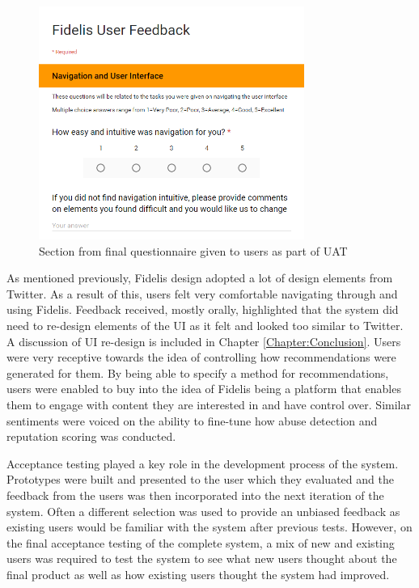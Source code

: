 \begin{figure}[H]
\centering
\includegraphics[height=3in]{Images/Testing/UATQuestionnaire}
\caption{Section from final questionnaire given to users as part of UAT}
\label{fig:UATQuestionnaire}
\end{figure}

As mentioned previously, Fidelis design adopted a lot of design elements from Twitter. As a result of this, users felt very comfortable navigating through and using Fidelis. Feedback received, mostly orally, highlighted that the system did need to re-design elements of the UI as it felt and looked too similar to Twitter. A discussion of UI re-design is included in Chapter \ref{Chapter:Conclusion}. Users were very receptive towards the idea of controlling how recommendations were generated for them. By being able to specify a method for recommendations, users were enabled to buy into the idea of Fidelis being a platform that enables them to engage with content they are interested in and have control over. Similar sentiments were voiced on the ability to fine-tune how abuse detection and reputation scoring was conducted.

Acceptance testing played a key role in the development process of the system. Prototypes were built and presented to the user which they evaluated and the feedback from the users was then incorporated into the next iteration of the system. Often a different selection was used to provide an unbiased feedback as existing users would be familiar with the system after previous tests. However, on the final acceptance testing of the complete system, a mix of new and existing users was required to test the system to see what new users thought about the final product as well as how existing users thought the system had improved.

